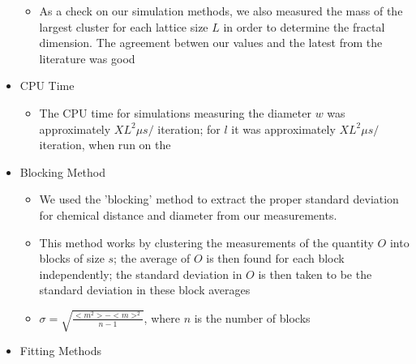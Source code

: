 \documentclass[11pt]{article}
\begin{document}
\begin{itemize}
\begin{itemize}
\item As a check on our simulation methods, we also measured the mass of the largest cluster for each lattice size $L$ in order to determine the fractal dimension.  The agreement betwen our values and the latest from the literature was good\\
\label{sec-4.2.5.6.1}

\end{itemize} %

\item CPU Time\\
\label{sec-4.2.5.7}

\begin{itemize}

\item The CPU time for simulations measuring the diameter $w$ was approximately $X L^2 \mu s /$ iteration; for $l$ it was approximately $X L^2 \mu s /$ iteration, when run on the\\
\label{sec-4.2.5.7.1}

\end{itemize} %

\item Blocking Method\\
\label{sec-4.3.1}

\begin{itemize}

\item We used the 'blocking' method \cite{NeBa99} to extract the proper standard deviation for chemical distance and diameter from our measurements.\\
\label{sec-4.3.1.1}


\item This method works by clustering the measurements of the quantity $O$ into blocks of size $s$; the average of $O$ is then found for each block independently;  the standard deviation in $O$ is then taken to be the standard deviation in these block averages\\
\label{sec-4.3.1.2}


\item $\sigma=\sqrt{ \frac{< m^2 > - < m >  ^2}{n-1}}$, where $n$ is the number of blocks\\
\label{sec-4.3.1.3}

\end{itemize} %

\item Fitting Methods\\
\label{sec-4.3.2}


\end{itemize}
\end{document}
